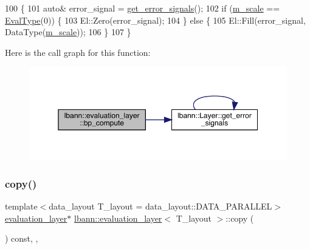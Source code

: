 \begin{DoxyCode}
100                                      \{
101     \textcolor{keyword}{auto}& error\_signal = \hyperlink{classlbann_1_1Layer_adb561e140e0bb601f3c5a8ee053a71d2}{get\_error\_signals}();
102     \textcolor{keywordflow}{if} (\hyperlink{classlbann_1_1evaluation__layer_af365bda5700dca43434b01f0a2b1ee45}{m\_scale} == \hyperlink{base_8hpp_a3266f5ac18504bbadea983c109566867}{EvalType}(0)) \{
103       El::Zero(error\_signal);
104     \} \textcolor{keywordflow}{else} \{
105       El::Fill(error\_signal, DataType(\hyperlink{classlbann_1_1evaluation__layer_af365bda5700dca43434b01f0a2b1ee45}{m\_scale}));
106     \}
107   \}
\end{DoxyCode}
Here is the call graph for this function\+:\nopagebreak
\begin{figure}[H]
\begin{center}
\leavevmode
\includegraphics[width=350pt]{classlbann_1_1evaluation__layer_a7b2b0898c0b0a29e35ec14f766758551_cgraph}
\end{center}
\end{figure}
\mbox{\label{classlbann_1_1evaluation__layer_a2fd584fec624d984d455ea82d92933ef}} 
\subsubsection{\texorpdfstring{copy()}{copy()}}
{\footnotesize\ttfamily template$<$data\+\_\+layout T\+\_\+layout = data\+\_\+layout\+::\+D\+A\+T\+A\+\_\+\+P\+A\+R\+A\+L\+L\+EL$>$ \\
\hyperlink{classlbann_1_1evaluation__layer}{evaluation\+\_\+layer}$\ast$ \hyperlink{classlbann_1_1evaluation__layer}{lbann\+::evaluation\+\_\+layer}$<$ T\+\_\+layout $>$\+::copy (\begin{DoxyParamCaption}{ }\end{DoxyParamCaption}) const\hspace{0.3cm}{\ttfamily [inline]}, {\ttfamily [override]}, {\ttfamily [virtual]}}

